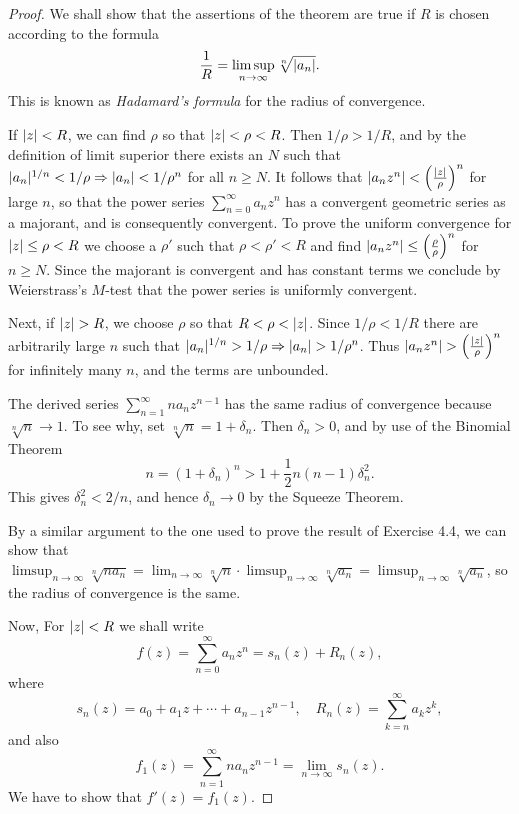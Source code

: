 \begin{proof}
	We shall show that the assertions of the theorem are true if $R$ is chosen according to the formula $$\dfrac{1}{R}=\limsup_{n \rightarrow \infty} \sqrt[n]{\lvert a_n \rvert}.$$ This is known as \emph{Hadamard's formula} for the radius of convergence.
	
	If $\lvert z \rvert<R$, we can find $\rho$ so that $\lvert z \rvert<\rho<R$. Then $1/\rho>1/R$, and by the definition of limit superior there exists an $N$ such that $\lvert a_n \rvert^{1/n}<1/\rho \Rightarrow \lvert a_n \rvert<1/\rho^n$ for all $n \ge N$. It follows that $\lvert a_nz^n \rvert<\left(\frac{\lvert z \rvert}{\rho}\right)^n$ for large $n$, so that the power series $\sum_{n=0}^{\infty}a_nz^n$ has a convergent geometric series as a majorant, and is consequently convergent. To prove the uniform convergence for $\lvert z \rvert \le \rho<R$ we choose a $\rho'$ such that $\rho<\rho'<R$ and find $\lvert a_nz^n \rvert \le \left(\frac{\rho}{\rho}\right)^n$ for $n \ge N$. Since the majorant is convergent and has constant terms we conclude by Weierstrass's $M$-test that the power series is uniformly convergent.
	
	Next, if $\lvert z \rvert>R$, we choose $\rho$ so that $R<\rho<\lvert z \rvert$. Since $1/\rho<1/R$ there are arbitrarily large $n$ such that $\lvert a_n \rvert^{1/n}>1/\rho \Rightarrow \lvert a_n \rvert>1/\rho^n$. Thus $\lvert a_nz^n \rvert>\left(\frac{\lvert z \rvert}{\rho}\right)^n$ for infinitely many $n$, and the terms are unbounded.
	
	The derived series $\sum_{n=1}^{\infty}na_nz^{n-1}$ has the same radius of convergence because $\sqrt[n]{n} \rightarrow 1$. To see why, set $\sqrt[n]{n}=1+\delta_n$. Then $\delta_n>0$, and by use of the Binomial Theorem $$n=(1+\delta_n)^n>1+\dfrac{1}{2}n(n-1)\delta_n^2.$$ This gives $\delta_n^2<2/n$, and hence $\delta_n \rightarrow 0$ by the Squeeze Theorem.
	
	By a similar argument to the one used to prove the result of Exercise 4.4, we can show that $\limsup_{n \rightarrow \infty} \sqrt[n]{na_n}=
	\lim_{n \rightarrow \infty} \sqrt[n]{n} \cdot \limsup_{n \rightarrow \infty}\sqrt[n]{a_n}=\limsup_{n \rightarrow \infty}\sqrt[n]{a_n}$, so the radius of convergence is the same.
	
	Now, For $\lvert z \rvert<R$ we shall write $$f(z)=\sum_{n=0}^{\infty}a_nz^n=s_n(z)+R_n(z),$$ where $$s_n(z)=a_0+a_1z+\cdots+a_{n-1}z^{n-1}, \quad R_n(z)=\sum_{k=n}^{\infty}a_kz^k,$$ and also $$f_1(z)=\sum_{n=1}^{\infty}na_nz^{n-1}=\lim_{n \rightarrow \infty}s_n(z).$$ We have to show that $f'(z)=f_1(z)$.
	

\end{proof}
